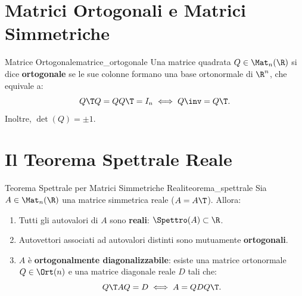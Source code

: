 \section{Matrici Ortogonali e Matrici Simmetriche}

\begin{definizione}{Matrice Ortogonale}{matrice_ortogonale}
Una matrice quadrata $Q \in \Mat_n(\R)$ si dice \textbf{ortogonale} se le sue colonne formano una base ortonormale di $\R^n$, che equivale a:
\begin{equation}
    Q\T Q = Q Q\T = I_n \iff Q\inv = Q\T.
\end{equation}
Inoltre, $\det(Q) = \pm 1$.
\end{definizione}

\section{Il Teorema Spettrale Reale}

\begin{teorema}{Teorema Spettrale per Matrici Simmetriche Reali}{teorema_spettrale}
Sia $A \in \Mat_n(\R)$ una matrice simmetrica reale ($A = A\T$). Allora:
\begin{enumerate}
    \item Tutti gli autovalori di $A$ sono \textbf{reali}: $\Spettro(A) \subset \R$.
    \item Autovettori associati ad autovalori distinti sono mutuamente \textbf{ortogonali}.
    \item $A$ è \textbf{ortogonalmente diagonalizzabile}: esiste una matrice ortonormale $Q \in \Ort(n)$ e una matrice diagonale reale $D$ tali che:
    \begin{equation}
        Q\T A Q = D \iff A = Q D Q\T.
    \end{equation}
\end{enumerate}
\end{teorema}
